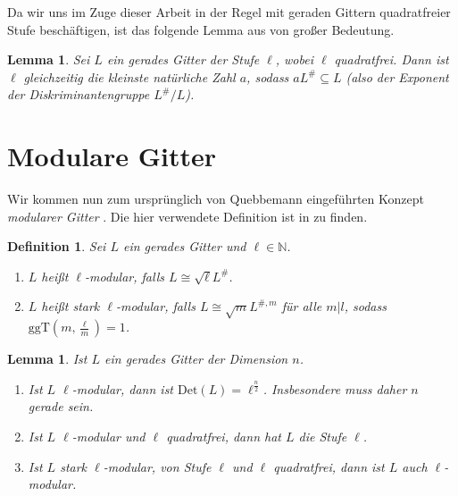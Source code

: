 \documentclass[12pt,a4paper,halfparskip,headsepline,bibtotocnumbered]{scrreprt}
\theoremstyle{nummermitklammern}
\newtheorem{definition}[defsatzusw]{Definition}
\newtheorem{lemma}[defsatzusw]{Lemma}
\theoremstyle{nonumberbreak}
\newcommand{\N}{\mathbb{N}}
\newcommand{\Det}{\text{Det}}
\newcommand{\ggT}{\text{ggT}}
\begin{document}
Da wir uns im Zuge dieser Arbeit in der Regel mit geraden Gittern quadratfreier Stufe beschäftigen, ist das folgende Lemma aus \cite[Lemma 1.1.1]{juergens} von großer Bedeutung.

\begin{framed}
	\begin{lemma}\label{lem:level}
		Sei $L$ ein gerades Gitter der Stufe $\ell$, wobei $\ell$ quadratfrei. Dann ist $\ell$ gleichzeitig die kleinste natürliche Zahl $a$, sodass $a L^\# \subseteq L$ (also der Exponent der Diskriminantengruppe $L^\# / L$).
	\end{lemma}
\end{framed}

\section{Modulare Gitter}

Wir kommen nun zum ursprünglich von Quebbemann eingeführten Konzept \textit{modularer Gitter} \cite{quebbemann}. Die hier verwendete Definition ist in \cite{fluckiger} zu finden.

\begin{framed}
	\begin{definition}
		Sei $L$ ein gerades Gitter und $\ell \in \N$.
		\begin{enumerate}[label=(\roman*)]
			\item $L$ heißt \textit{$\ell$-modular}, falls $L \cong \sqrt{\ell}L^\#$.
			\item $L$ heißt \textit{stark $\ell$-modular}, falls $L \cong \sqrt{m} L^{\#,m}$ für alle $m \vert l$, sodass $\ggT(m,\frac{\ell}{m}) = 1$.
		\end{enumerate}
	\end{definition}
\end{framed}

\begin{framed}
	\begin{lemma}\label{lem:mod}
		Ist $L$ ein gerades Gitter der Dimension $n$.
		\begin{enumerate}[label=(\roman*)]
			\item Ist $L$ $\ell$-modular, dann ist $\Det(L) = \ell^{\frac{n}{2}}$. Insbesondere muss daher $n$ gerade sein.
			\item Ist $L$ $\ell$-modular und $\ell$ quadratfrei, dann hat $L$ die Stufe $\ell$.
			\item Ist $L$ stark $\ell$-modular, von Stufe $\ell$ und $\ell$ quadratfrei, dann ist $L$ auch $\ell$-modular.
		\end{enumerate}
	\end{lemma}
\end{framed}
\end{document}
